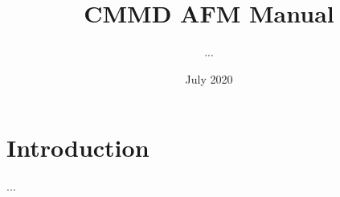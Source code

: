 \documentclass{article}
\title{CMMD AFM Manual}
\author{...}
\date{July 2020}
\begin{document}
\maketitle

\section{Introduction}
...
\end{document}
